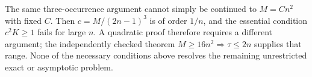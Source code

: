 The same three-occurrence argument cannot simply be continued to
$M=Cn^2$ with fixed $C$. Then $c=M/(2n-1)^3$ is of order $1/n$,
and the essential condition $c^2K\ge1$ fails for large $n$.
A quadratic proof therefore requires a different argument; the
independently checked theorem $M\ge16n^2\Rightarrow\tau\le2n$
\cite{Wang} supplies that range. None of the necessary conditions
above resolves the remaining unrestricted exact or asymptotic
problem.
